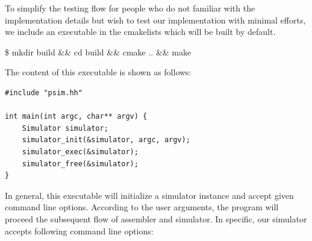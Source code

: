 \documentclass[conference, draftclsnofoot, letterpaper]{IEEETran}
\begin{document}
To simplify the testing flow for people who do not familiar with the implementation details but wish to test our implementation with minimal efforts, we include an executable in the cmakelists which will be built by default. 

\begin{tcolorbox}
	\$ mkdir build \&\& cd build \&\& cmake .. \&\& make 
\end{tcolorbox}

The content of this executable is shown as follows: 



\begin{lstlisting}
#include "psim.hh"

int main(int argc, char** argv) {
	Simulator simulator;
	simulator_init(&simulator, argc, argv);
	simulator_exec(&simulator);
	simulator_free(&simulator);
}
\end{lstlisting}

In general, this executable will initialize a simulator instance and accept given command line options. According to the user arguments, the program will proceed the subsequent flow of assembler and simulator. In specific, our simulator accepts following command line options: 
\end{document}

